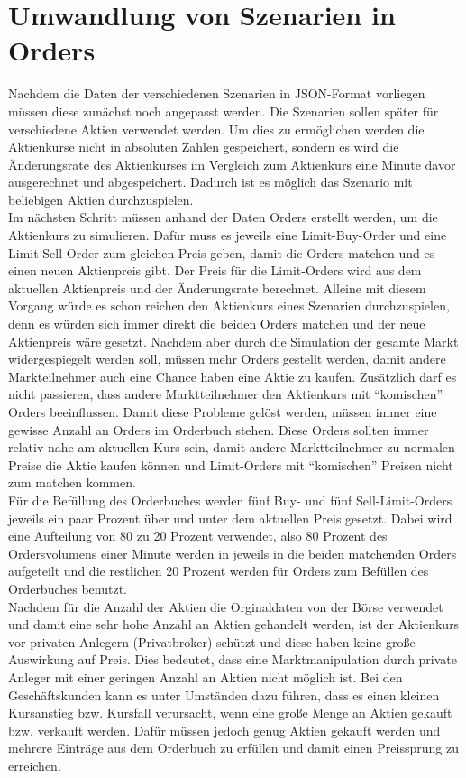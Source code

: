 \section{Umwandlung von Szenarien in Orders}
Nachdem die Daten der verschiedenen Szenarien in JSON-Format vorliegen müssen diese zunächst noch angepasst werden. Die 
Szenarien sollen später für verschiedene Aktien verwendet werden. Um dies zu ermöglichen werden die Aktienkurse nicht in 
absoluten Zahlen gespeichert, sondern es wird die Änderungsrate des Aktienkurses im Vergleich zum Aktienkurs eine Minute davor 
ausgerechnet und abgespeichert. Dadurch ist es möglich das Szenario mit beliebigen Aktien durchzuspielen. \\
Im nächsten Schritt müssen anhand der Daten Orders erstellt werden, um die Aktienkurs zu simulieren. Dafür muss es jeweils eine Limit-Buy-Order 
und eine Limit-Sell-Order zum gleichen Preis geben, damit die Orders matchen und es einen neuen Aktienpreis gibt. Der Preis für die 
Limit-Orders wird aus dem aktuellen Aktienpreis und der Änderungsrate berechnet. Alleine mit diesem Vorgang würde es schon reichen 
den Aktienkurs eines Szenarien durchzuspielen, denn es würden sich immer direkt die beiden Orders matchen und der neue Aktienpreis 
wäre gesetzt. Nachdem aber durch die Simulation der gesamte Markt widergespiegelt werden soll, müssen mehr Orders gestellt werden, damit 
andere Markteilnehmer auch eine Chance haben eine Aktie zu kaufen. Zusätzlich darf es nicht passieren, dass andere Marktteilnehmer 
den Aktienkurs mit \enquote{komischen} Orders beeinflussen. Damit diese Probleme gelöst werden, müssen immer eine gewisse Anzahl an Orders 
im Orderbuch stehen. Diese Orders sollten immer relativ nahe am aktuellen Kurs sein, damit andere Marktteilnehmer zu normalen Preise die 
Aktie kaufen können und Limit-Orders mit \enquote{komischen} Preisen nicht zum matchen kommen. \\
Für die Befüllung des Orderbuches werden fünf Buy- und fünf Sell-Limit-Orders jeweils ein paar Prozent über und unter dem aktuellen 
Preis gesetzt. Dabei wird eine Aufteilung von 80 zu 20 Prozent verwendet, also 80 Prozent des Ordersvolumens einer Minute werden in jeweils 
in die beiden matchenden Orders aufgeteilt und die restlichen 20 Prozent werden für Orders zum Befüllen des Orderbuches benutzt.\\
Nachdem für die Anzahl der Aktien die Orginaldaten von der Börse verwendet und damit eine sehr hohe Anzahl an Aktien gehandelt werden, ist der Aktienkurs vor 
privaten Anlegern (Privatbroker) schützt und diese haben keine große Auswirkung auf Preis. Dies bedeutet, dass eine Marktmanipulation durch private Anleger mit 
einer geringen Anzahl an Aktien nicht möglich ist. Bei den Geschäftskunden kann es unter Umständen dazu führen, dass es einen kleinen Kursanstieg bzw. Kursfall 
verursacht, wenn eine große Menge an Aktien gekauft bzw. verkauft werden. Dafür müssen jedoch genug Aktien gekauft werden und mehrere Einträge aus dem Orderbuch 
zu erfüllen und damit einen Preissprung zu erreichen.
